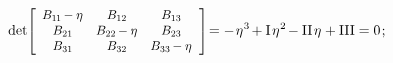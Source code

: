 \begin{otherlanguage}{russian}
\nopagebreak\vspace{-0.1em}\begin{equation}\label{chardetequation}
\operatorname{det} \hspace{-0.4ex} \scalebox{0.9}[0.92]{$\left[
\begin{array}{ccc}
B_{1\hspace{-0.1ex}1} \hspace{-0.16ex} - \eigenvalue & B_{12} & B_{13} \\
B_{21} & B_{22} \hspace{-0.16ex} - \eigenvalue & B_{23} \\
B_{31} & B_{32} & B_{33} \hspace{-0.16ex} - \eigenvalue
\end{array}
\hspace{.1ex}\right]$} \hspace{-0.4ex} = - \hspace{.2ex} \eigenvalue^3 \hspace{-0.25ex} + \mathrm{I}\hspace{.25ex} \eigenvalue^2 \hspace{-0.25ex} - \mathrm{II}\hspace{.25ex} \eigenvalue + \mathrm{III} = 0 \hspace{.2ex} ;
\end{equation}


\end{otherlanguage}
